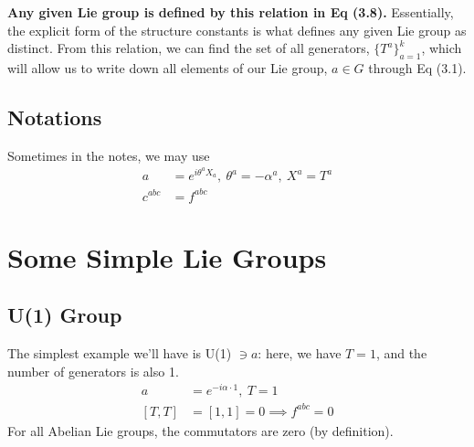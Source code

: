\documentclass[relqm.tex]{subfiles}
\begin{document}
\textbf{Any given Lie group is defined by this relation in Eq (3.8).}
Essentially, the explicit form of the structure constants is what defines any given Lie group as distinct.
From this relation, we can find the set of all generators, $\{T^a\}^k_{a=1}$, which will allow us to write down all elements of our Lie group, $a\in G$ through Eq (3.1).

\subsection{Notations}
Sometimes in the notes, we may use 
\begin{align}
    a &= e^{i\theta^a X_a},~ \theta^a = -\alpha^a,~ X^a = T^a \\
    c^{abc} &=  f^{abc}
\end{align}

\section{Some Simple Lie Groups}
\subsection{U(1) Group}
The simplest example we'll have is U(1) $\ni a$: here, we have $T=1$, and the number of generators is also 1.
        \begin{align}
            a &= e^{-i\alpha\cdot1},~ T=1 \\
            [T,T] &= [1,1] = 0 \implies f^{abc} = 0
        \end{align}
        For all Abelian Lie groups, the commutators are zero (by definition).
\end{document}
